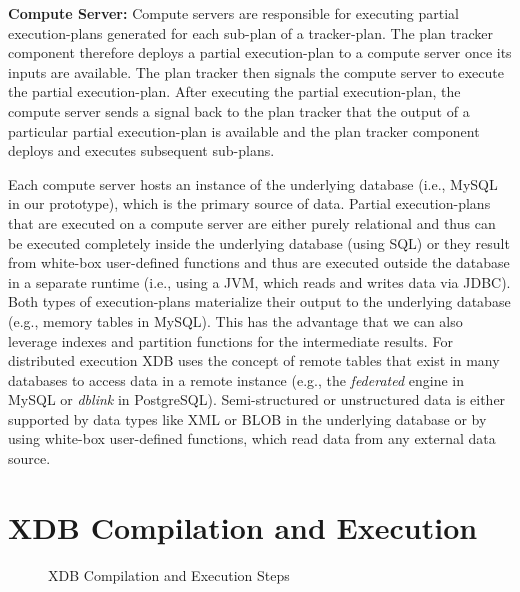 \documentclass{sig-alternate}
\begin{document}
{\bf Compute Server: } Compute servers are responsible for executing partial execution-plans generated for each sub-plan of a tracker-plan. The plan tracker component therefore deploys a partial execution-plan to a compute server once its inputs are available. The plan tracker then signals the compute server to execute the partial execution-plan. After executing the partial execution-plan, the compute server sends a signal back to the plan tracker that the output of a particular partial execution-plan is available and the plan tracker component deploys and executes subsequent sub-plans. 

Each compute server hosts an instance of the underlying database (i.e., MySQL in our prototype), which is the primary source of data. Partial execution-plans that are executed on a compute server are either purely relational and thus can be executed completely inside the underlying database (using SQL) or they result from white-box user-defined functions and thus are  executed outside the database in a separate runtime (i.e., using a JVM, which reads and writes data via JDBC). Both types of execution-plans materialize their output to the underlying database (e.g., memory tables in MySQL). This has the advantage that we can also leverage indexes and partition functions for the intermediate results. For distributed execution XDB uses the concept of remote tables that exist in many databases to access data in a remote instance (e.g., the \emph{federated} engine in MySQL or \emph{dblink} in PostgreSQL). Semi-structured or unstructured data is either supported by data types like XML or BLOB in the underlying database or by using white-box user-defined functions, which read data from any external data source.

\section{XDB Compilation and Execution}
\label{sec:exec}

\begin{figure*}[ht]
\hspace{-6ex}
\hspace{-3ex}
\hspace{-2.5ex}
\vspace{-3ex}
\caption{XDB Compilation and Execution Steps}
\label{fig:xdb:exec}
\vspace{-2ex}
\end{figure*}
\end{document}
